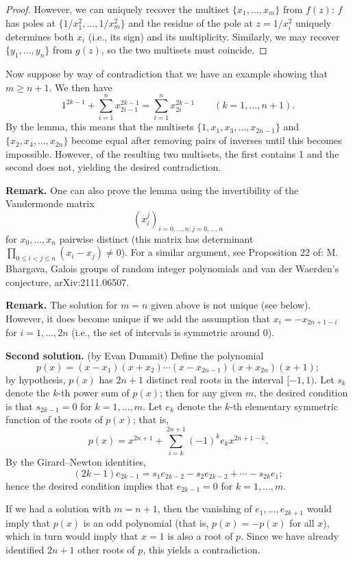 \documentclass[amssymb,twocolumn,pra,10pt,aps]{revtex4-1}
\begin{document}
\begin{itemize}
\begin{proof}
However, we can uniquely recover the multiset $\{x_1,\dots,x_m\}$ from $f(z)$: $f$ has poles at $\{1/x_1^2,\dots,1/x_m^2\}$
and the residue of the pole at $z = 1/x_i^2$ uniquely determines both $x_i$ (i.e., its sign) and its multiplicity.
Similarly, we may recover $\{y_1,\dots,y_n\}$ from $g(z)$, so the two multisets must coincide.
\end{proof}

Now suppose by way of contradiction that we have an example showing that $m \geq n+1$. We then have
\[
1^{2k-1} + \sum_{i=1}^n x_{2i-1}^{2k-1} = \sum_{i=1}^n x_{2i}^{2k-1} \qquad (k=1,\dots,n+1).
\]
By the lemma, this means that the multisets $\{1,x_1,x_3,\dots,x_{2n-1}\}$ and $\{x_2,x_4,\dots,x_{2n}\}$ become equal after removing pairs of inverses until this becomes impossible. However, of the resulting two multisets, the first contains 1 and the second does not, yielding the desired contradiction.

\noindent
\textbf{Remark.}
One can also prove the lemma using the invertibility of the Vandermonde matrix
\[
(x_i^j)_{i=0,\dots,n; j=0,\dots,n}
\]
for $x_0,\dots,x_n$ pairwise distinct (this matrix has determinant $\prod_{0 \leq i < j \leq n}(x_i - x_j) \neq 0$). For a similar argument, see
Proposition 22 of: M. Bhargava, Galois groups of random integer polynomials and van der Waerden's conjecture, arXiv:2111.06507.

\noindent
\textbf{Remark.}
The solution for $m=n$ given above is not unique (see below).
However, it does become unique if we add the assumption that $x_i = -x_{2n+1-i}$ for $i=1,\dots,2n$ (i.e., the set of intervals is symmetric around 0).

\noindent
\textbf{Second solution.} (by Evan Dummit)
Define the polynomial
\[
p(x) = (x-x_1)(x+x_2) \cdots (x-x_{2n-1})(x+x_{2n})(x+1);
\]
by hypothesis, $p(x)$ has $2n+1$ distinct real roots in the interval $[-1, 1)$. Let $s_k$ denote the $k$-th power sum of $p(x)$; then for any given $m$, the desired condition is that
$s_{2k-1} = 0$ for $k=1,\dots,m$.
Let $e_k$ denote the $k$-th elementary symmetric function of the roots of $p(x)$; that is,
\[
p(x) = x^{2n+1} + \sum_{i=k}^{2n+1} (-1)^k e_k x^{2n+1-k}.
\]
By the Girard--Newton identities,
\[
(2k-1) e_{2k-1} = s_1 e_{2k-2} - s_2 e_{2k-2} + \cdots - s_{2k} e_1;
\]
hence the desired condition implies that $e_{2k-1} = 0$ for $k=1,\dots,m$.

If we had a solution with $m=n+1$, then the vanishing of $e_1,\dots,e_{2k+1}$ would imply that $p(x)$ is an odd polynomial (that is, $p(x) = -p(x)$ for all $x$), which in turn would imply that $x=1$ is also a root of $p$. Since we have already identified $2n+1$ other roots of $p$, this yields a contradiction.


\end{itemize}
\end{document}
